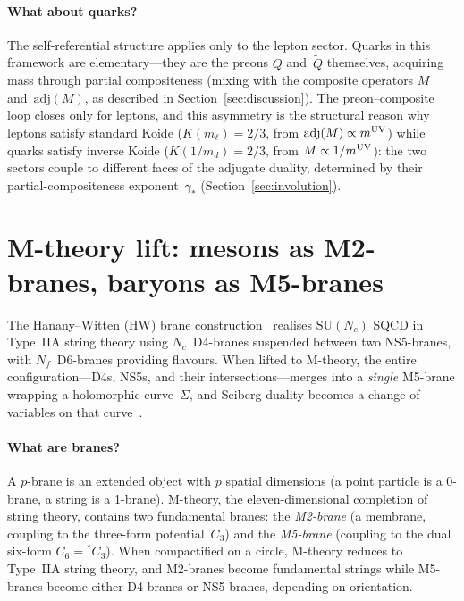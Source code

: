 \documentclass[12pt,a4paper]{article}
\newcommand{\SU}{\mathrm{SU}}
\newcommand{\Nf}{N_f}
\newcommand{\adj}{\mathrm{adj}}
\begin{document}
\paragraph{What about quarks?}
The self-referential structure applies only to the lepton sector.
Quarks in this framework are elementary---they are the preons $Q$
and~$\tilde{Q}$ themselves, acquiring mass through partial
compositeness (mixing with the composite operators $M$
and~$\adj(M)$, as described in
Section~\ref{sec:discussion}).  The preon--composite loop
closes only for leptons, and this asymmetry is the structural
reason why leptons satisfy standard Koide ($K(m_\ell) = 2/3$, from
$\adj(M) \propto m^{\rm UV}$) while quarks satisfy inverse Koide
($K(1/m_d) = 2/3$, from $M \propto 1/m^{\rm UV}$): the two
sectors couple to different faces of the adjugate duality,
determined by their partial-compositeness exponent~$\gamma_*$
(Section~\ref{sec:involution}).


\section{M-theory lift: mesons as M2-branes, baryons as M5-branes}
\label{app:Mtheory}

The Hanany--Witten (HW) brane construction~\cite{HananyWitten:1997}
realises $\SU(N_c)$ SQCD in Type~IIA string theory using
$N_c$~D4-branes suspended between two NS5-branes, with
$\Nf$~D6-branes providing flavours.  When lifted to M-theory,
the entire configuration---D4s, NS5s, and their
intersections---merges into a \emph{single} M5-brane wrapping a
holomorphic curve~$\Sigma$, and Seiberg duality becomes a change of
variables on that curve~\cite{Witten:1997M5}.

\paragraph{What are branes?}
A $p$-brane is an extended object with $p$ spatial dimensions (a
point particle is a 0-brane, a string is a 1-brane).  M-theory, the
eleven-dimensional completion of string theory, contains two
fundamental branes: the \emph{M2-brane} (a membrane, coupling to the
three-form potential~$C_3$) and the \emph{M5-brane} (coupling to the
dual six-form $C_6 = {}^*C_3$).  When compactified on a circle,
M-theory reduces to Type~IIA string theory, and M2-branes become
fundamental strings while M5-branes become either D4-branes or
NS5-branes, depending on orientation.
\end{document}
